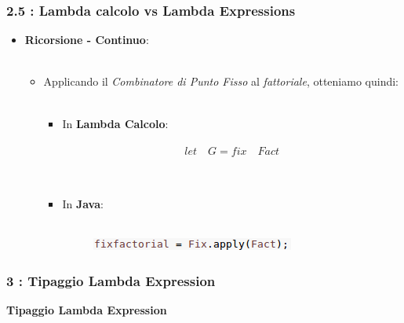 \documentclass{beamer}
\begin{document}
\begin{frame}
	\frametitle{\textbf{2.5 : Lambda calcolo vs Lambda Expressions}}
	\begin{itemize}
		\item
			\textbf{Ricorsione - Continuo}:\\\
			\begin{itemize}
				\item 
					Applicando il \textit{Combinatore di Punto Fisso} al \textit{fattoriale}, otteniamo quindi:\\\
					\begin{itemize}
						\item 
							In \textbf{Lambda Calcolo}:\\\
								\[
									let \quad G = fix \quad Fact
								\]\\\
						\item 
							In \textbf{Java}:\\\
								\begin{figure}
									\centering
									\includegraphics[width=0.8\linewidth]{image/factok.png}
									\label{fig:identity}
								\end{figure}
					\end{itemize}
			\end{itemize}
	\end{itemize}
\end{frame}


\begin{frame}
	\frametitle{\textbf{3 : Tipaggio Lambda Expression}}
	\begin{center}
		\textbf{\Huge Tipaggio Lambda Expression}
	\end{center}
\end{frame}

\end{document}
